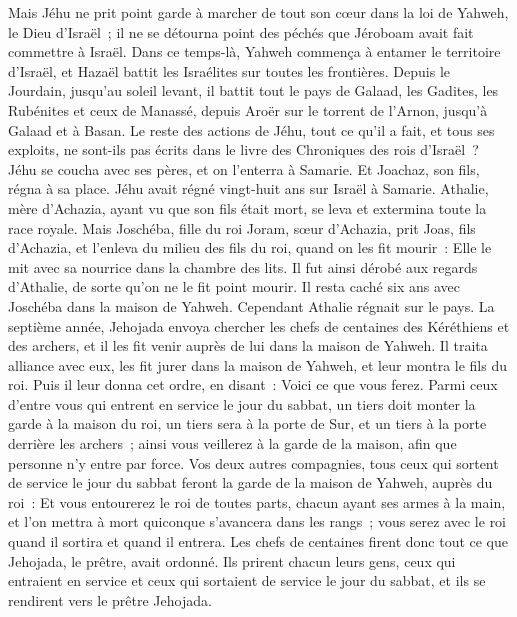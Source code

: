 \begin{multicols}{2}
Mais Jéhu ne prit point garde à marcher de tout son cœur dans la loi de Yahweh, le Dieu d'Israël~; il ne se détourna point des péchés que Jéroboam avait fait commettre à Israël.
Dans ce temps-là, Yahweh commença à entamer le territoire d'Israël, et Hazaël battit les Israélites sur toutes les frontières.
Depuis le Jourdain, jusqu'au soleil levant, il battit tout le pays de Galaad, les Gadites, les Rubénites et ceux de Manassé, depuis Aroër sur le torrent de l'Arnon, jusqu'à Galaad et à Basan.
Le reste des actions de Jéhu, tout ce qu'il a fait, et tous ses exploits, ne sont-ils pas écrits dans le livre des Chroniques des rois d'Israël~?
Jéhu se coucha avec ses pères, et on l'enterra à Samarie. Et Joachaz, son fils, régna à sa place.
Jéhu avait régné vingt-huit ans sur Israël à Samarie.
\VerseOne{}Athalie, mère d'Achazia, ayant vu que son fils était mort, se leva et extermina toute la race royale.
Mais Joschéba, fille du roi Joram, sœur d'Achazia, prit Joas, fils d'Achazia, et l'enleva du milieu des fils du roi, quand on les fit mourir~: Elle le mit avec sa nourrice dans la chambre des lits. Il fut ainsi dérobé aux regards d'Athalie, de sorte qu'on ne le fit point mourir.
Il resta caché six ans avec Joschéba dans la maison de Yahweh. Cependant Athalie régnait sur le pays.
La septième année, Jehojada envoya chercher les chefs de centaines des Kéréthiens et des archers, et il les fit venir auprès de lui dans la maison de Yahweh. Il traita alliance avec eux, les fit jurer dans la maison de Yahweh, et leur montra le fils du roi.
Puis il leur donna cet ordre, en disant~: Voici ce que vous ferez. Parmi ceux d'entre vous qui entrent en service le jour du sabbat, un tiers doit monter la garde à la maison du roi,
un tiers sera à la porte de Sur, et un tiers à la porte derrière les archers~; ainsi vous veillerez à la garde de la maison, afin que personne n'y entre par force.
Vos deux autres compagnies, tous ceux qui sortent de service le jour du sabbat feront la garde de la maison de Yahweh, auprès du roi~:
Et vous entourerez le roi de toutes parts, chacun ayant ses armes à la main, et l'on mettra à mort quiconque s'avancera dans les rangs~; vous serez avec le roi quand il sortira et quand il entrera.
Les chefs de centaines firent donc tout ce que Jehojada, le prêtre, avait ordonné. Ils prirent chacun leurs gens, ceux qui entraient en service et ceux qui sortaient de service le jour du sabbat, et ils se rendirent vers le prêtre Jehojada.

\end{multicols}
